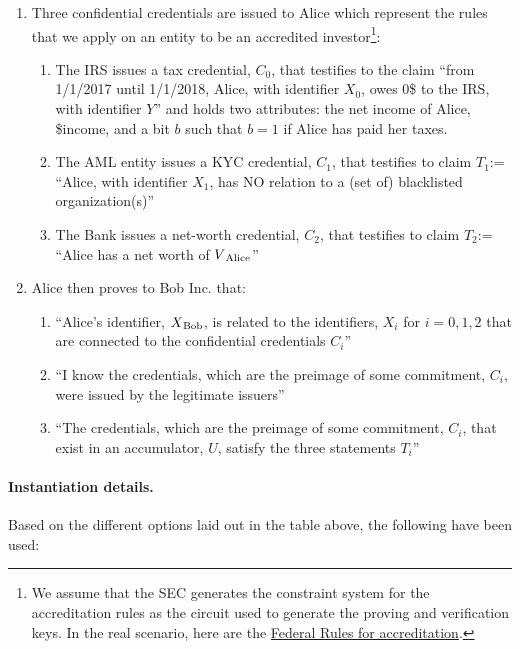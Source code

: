 \begin{enumerate}
\item Three confidential credentials are issued to Alice which represent the rules that we apply on an entity to be an accredited investor\footnote{We assume that the SEC generates the constraint system for the accreditation rules as the circuit used to generate the proving and verification keys. In the real scenario, here are the \href{https://www.ecfr.gov/cgi-bin/retrieveECFR?gp=&SID=8edfd12967d69c024485029d968ee737&r=SECTION&n=17y3.0.1.1.12.0.46.176}{Federal Rules for accreditation}.}:
		\begin{enumerate}
        \item The IRS issues a tax credential, $C_0$, that testifies to the claim “from 1/1/2017 until 1/1/2018, Alice, with identifier $X_0$, owes 0\$ to the IRS, with identifier $Y$” and holds two attributes: the net income of Alice, \$income, and a bit $b$ such that $b=1$ if Alice has paid her taxes.
        \item The AML entity issues a KYC credential, $C_1$, that testifies to claim $T_1$:= “Alice, with identifier $X_1$, has NO relation to a (set of) blacklisted organization(s)”
        \item The Bank issues a net-worth credential, $C_2$, that testifies to claim $T_2$:= “Alice has a net worth of $V\textsubscript{Alice}$”
		\end{enumerate}
\item Alice then proves to Bob Inc. that:
    \begin{enumerate}
				\item “Alice’s identifier, $X\textsubscript{Bob}$, is related to the identifiers, {$X_i$} for $i = 0, 1, 2$ that are connected to the confidential credentials {$C_i$}”
        \item “I know the credentials, which are the preimage of some commitment, {$C_i$}, were issued by the legitimate issuers”
        \item “The credentials, which are the preimage of some commitment, {$C_i$}, that exist in an accumulator, $U$, satisfy the three statements {$T_i$}”
		\end{enumerate}
\end{enumerate}



\paragraph{Instantiation details.}
Based on the different options laid out in the table above, the following have been used:

